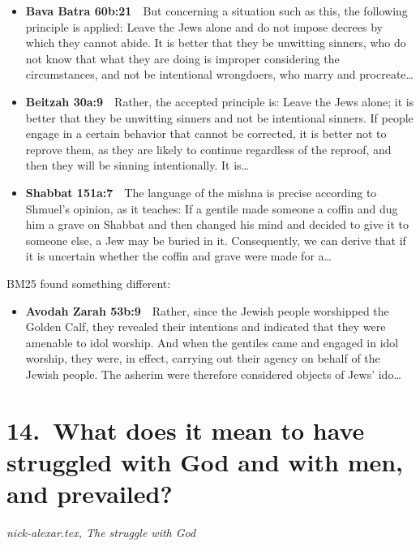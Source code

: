 \documentclass[11pt,a4paper]{article}
\begin{document}
\begin{itemize}[leftmargin=1.2em,itemsep=3pt]
\item {\color{ref}\textbf{Bava Batra 60b:21}}\ \ But concerning a situation such as this, the following principle is applied: Leave the Jews alone and do not impose decrees by which they cannot abide. It is better that they be unwitting sinners, who do not know that what they are doing is improper considering the circumstances, and not be intentional wrongdoers, who marry and procreate\ldots
\item {\color{ref}\textbf{Beitzah 30a:9}}\ \ Rather, the accepted principle is: Leave the Jews alone; it is better that they be unwitting sinners and not be intentional sinners. If people engage in a certain behavior that cannot be corrected, it is better not to reprove them, as they are likely to continue regardless of the reproof, and then they will be sinning intentionally. It is\ldots
\item {\color{ref}\textbf{Shabbat 151a:7}}\ \ The language of the mishna is precise according to Shmuel’s opinion, as it teaches: If a gentile made someone a coffin and dug him a grave on Shabbat and then changed his mind and decided to give it to someone else, a Jew may be buried in it. Consequently, we can derive that if it is uncertain whether the coffin and grave were made for a\ldots
\end{itemize}
{\color{quiet}\small BM25 found something different:}
\begin{itemize}[leftmargin=1.2em]
\item {\color{ref}\textbf{Avodah Zarah 53b:9}}\ \ Rather, since the Jewish people worshipped the Golden Calf, they revealed their intentions and indicated that they were amenable to idol worship. And when the gentiles came and engaged in idol worship, they were, in effect, carrying out their agency on behalf of the Jewish people. The asherim were therefore considered objects of Jews’ ido\ldots
\end{itemize}

\section*{14.\ What does it mean to have struggled with God and with men, and prevailed?}
{\color{quiet}\small\textit{nick-alexar.tex, The struggle with God}}
\end{document}

